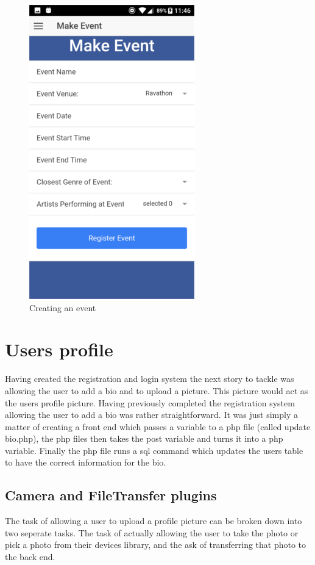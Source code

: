 \begin{center}
\begin{figure}[H]
\includegraphics[scale=0.5]{images/sc18}
\caption{Creating an event}
\end{figure}
\end{center}

\section{Users profile}
Having created the registration and login system the next story to tackle was allowing the user to add a bio and to upload a picture. This picture would act as the users profile picture. Having previously completed the registration system allowing the user to add a bio was rather straightforward. It was just simply a matter of creating a front end which passes a variable to a php file (called update bio.php), the php files then takes the post variable and turns it into a php variable. Finally the php file runs a sql command which updates the users table to have the correct information for the bio.

\subsection{Camera and FileTransfer plugins}
The task of allowing a user to upload a profile picture can be broken down into two seperate tasks. The task of actually allowing the user to take the photo or pick a photo from their devices library, and the ask of transferring that photo to the back end. 

